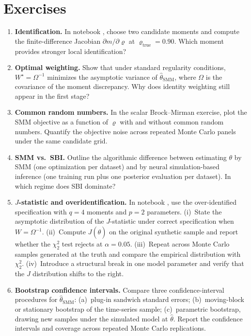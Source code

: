 \documentclass[11pt,a4paper]{report}
\begin{document}
\section*{Exercises}
\begin{enumerate}[itemsep=4pt, leftmargin=*]
\item\label{ex:ch10:1} \textbf{Identification.}  In notebook , choose two candidate moments and compute the finite-difference Jacobian $\partial m/\partial\varrho$ at $\varrho_{\mathrm{true}}=0.90$.  Which moment provides stronger local identification?
\item\label{ex:ch10:2} \textbf{Optimal weighting.}  Show that under standard regularity conditions, $W^\star=\Omega^{-1}$ minimizes the asymptotic variance of $\hat\theta_{\mathrm{SMM}}$, where $\Omega$ is the covariance of the moment discrepancy.  Why does identity weighting still appear in the first stage?
\item\label{ex:ch10:3} \textbf{Common random numbers.}  In the scalar Brock--Mirman exercise, plot the SMM objective as a function of $\varrho$ with and without common random numbers.  Quantify the objective noise across repeated Monte Carlo panels under the same candidate grid.
\item\label{ex:ch10:4} \textbf{SMM vs.\ SBI.}  Outline the algorithmic difference between estimating $\theta$ by SMM (one optimization per dataset) and by neural simulation-based inference (one training run plus one posterior evaluation per dataset).  In which regime does SBI dominate?
\item\label{ex:ch10:5} \textbf{$J$-statistic and overidentification.}  In notebook , use the over-identified specification with $q=4$ moments and $p=2$ parameters.  (i)~State the asymptotic distribution of the $J$-statistic under correct specification when $W=\Omega^{-1}$.  (ii)~Compute $J(\hat\theta)$ on the original synthetic sample and report whether the $\chi^2_2$ test rejects at $\alpha=0.05$.  (iii)~Repeat across Monte Carlo samples generated at the truth and compare the empirical distribution with $\chi^2_2$.  (iv)~Introduce a structural break in one model parameter and verify that the $J$ distribution shifts to the right.
\item\label{ex:ch10:6} \textbf{Bootstrap confidence intervals.}  Compare three confidence-interval procedures for $\hat\theta_\mathrm{SMM}$: (a)~plug-in sandwich standard errors; (b)~moving-block or stationary bootstrap of the time-series sample; (c)~parametric bootstrap, drawing new samples under the simulated model at $\hat\theta$.  Report the confidence intervals and coverage across repeated Monte Carlo replications.

\end{enumerate}
\end{document}
